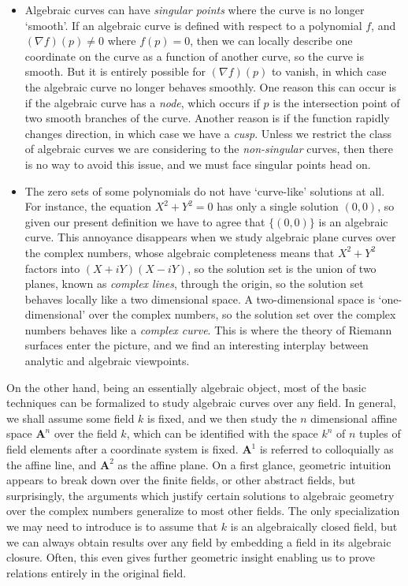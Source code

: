 \begin{itemize}
    \item Algebraic curves can have \emph{singular points} where the curve is no longer `smooth'. If an algebraic curve is defined with respect to a polynomial $f$, and $(\nabla f)(p) \neq 0$ where $f(p) = 0$, then we can locally describe one coordinate on the curve as a function of another curve, so the curve is smooth. But it is entirely possible for $(\nabla f)(p)$ to vanish, in which case the algebraic curve no longer behaves smoothly. One reason this can occur is if the algebraic curve has a \emph{node}, which occurs if $p$ is the intersection point of two smooth branches of the curve. Another reason is if the function rapidly changes direction, in which case we have a \emph{cusp}. Unless we restrict the class of algebraic curves we are considering to the \emph{non-singular} curves, then there is no way to avoid this issue, and we must face singular points head on.

    \item The zero sets of some polynomials do not have `curve-like' solutions at all. For instance, the equation $X^2 + Y^2 = 0$ has only a single solution $(0,0)$, so given our present definition we have to agree that $\{ (0,0) \}$ is an algebraic curve. This annoyance disappears when we study algebraic plane curves over the complex numbers, whose algebraic completeness means that $X^2 + Y^2$ factors into $(X + iY)(X - iY)$, so the solution set is the union of two planes, known as \emph{complex lines}, through the origin, so the solution set behaves locally like a two dimensional space. A two-dimensional space is `one-dimensional' over the complex numbers, so the solution set over the complex numbers behaves like a \emph{complex curve}. This is where the theory of Riemann surfaces enter the picture, and we find an interesting interplay between analytic and algebraic viewpoints.
\end{itemize}
%
On the other hand, being an essentially algebraic object, most of the basic techniques can be formalized to study algebraic curves over any field. In general, we shall assume some field $k$ is fixed, and we then study the $n$ dimensional affine space $\mathbf{A}^n$ over the field $k$, which can be identified with the space $k^n$ of $n$ tuples of field elements after a coordinate system is fixed. $\mathbf{A}^1$ is referred to colloquially as the affine line, and $\mathbf{A}^2$ as the affine plane. On a first glance, geometric intuition appears to break down over the finite fields, or other abstract fields, but surprisingly, the arguments which justify certain solutions to algebraic geometry over the complex numbers generalize to most other fields. The only specialization we may need to introduce is to assume that $k$ is an algebraically closed field, but we can always obtain results over any field by embedding a field in its algebraic closure. Often, this even gives further geometric insight enabling us to prove relations entirely in the original field.

